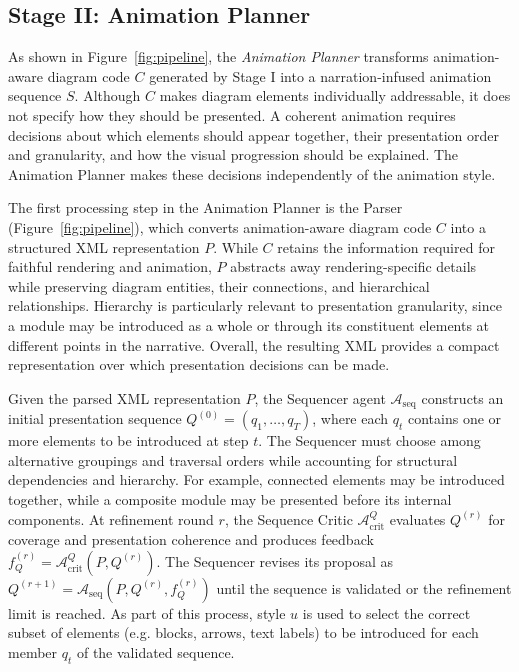 \documentclass{article} %
\begin{document}
\subsection{Stage II: Animation Planner}

As shown in Figure~\ref{fig:pipeline}, the \textit{Animation Planner} transforms animation-aware diagram code $C$ generated by Stage I into a narration-infused animation sequence $S$. Although $C$ makes diagram elements individually addressable, it does not specify how they should be presented. A coherent animation requires decisions about which elements should appear together, their presentation order and granularity, and how the visual progression should be explained. The Animation Planner makes these decisions independently of the  animation style.

The first processing step in the Animation Planner is the Parser (Figure~\ref{fig:pipeline}), which converts animation-aware diagram code $C$ into a structured XML representation $P$. While $C$ retains the information required for faithful rendering and animation, $P$ abstracts away rendering-specific details while preserving diagram entities, their connections, and hierarchical relationships. Hierarchy is particularly relevant to presentation granularity, since a module may be introduced as a whole or through its constituent elements at different points in the narrative. Overall, the resulting XML provides a compact representation over which presentation decisions can be made.

Given the parsed XML representation $P$, the Sequencer agent $\mathcal{A}_{\mathrm{seq}}$ constructs an initial presentation sequence $Q^{(0)}=(q_1,\ldots,q_T)$, where each $q_t$ contains one or more elements to be introduced at step $t$. The Sequencer must choose among alternative groupings and traversal orders while accounting for structural dependencies and hierarchy. For example, connected elements may be introduced together, while a composite module may be presented before its internal components. At refinement round $r$, the Sequence Critic $\mathcal{A}_{\mathrm{crit}}^{Q}$ evaluates $Q^{(r)}$ for coverage and presentation coherence and produces feedback $f_Q^{(r)}=\mathcal{A}_{\mathrm{crit}}^{Q}(P,Q^{(r)})$. The Sequencer revises its proposal as $Q^{(r+1)}=\mathcal{A}_{\mathrm{seq}}(P,Q^{(r)},f_Q^{(r)})$ until the sequence is validated or the refinement limit is reached. As part of this process, style $u$ is used to select the correct subset of elements (e.g. blocks, arrows, text labels) to be introduced for each member $q_t$ of the validated sequence.
\end{document}
